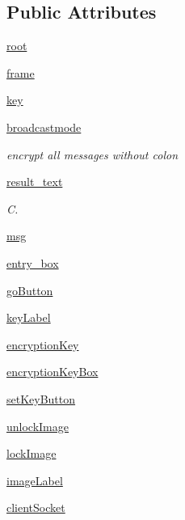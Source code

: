 \subsection*{Public Attributes}
\begin{DoxyCompactItemize}
\item 
\hyperlink{classgui_version_1_1_chat_client_g_u_i_afec7497b20c1d133c5c026c9625a1691}{root}
\item 
\hyperlink{classgui_version_1_1_chat_client_g_u_i_a7809572437bc7888072cb612990da273}{frame}
\item 
\hyperlink{classgui_version_1_1_chat_client_g_u_i_afe7983bc0c4a2f71030e992caca57b43}{key}
\item 
\hyperlink{classgui_version_1_1_chat_client_g_u_i_a24c3049b3a6f498d56685eef5405baf6}{broadcastmode}
\begin{DoxyCompactList}\small\item\em encrypt all messages without colon \end{DoxyCompactList}\item 
\hyperlink{classgui_version_1_1_chat_client_g_u_i_aed7ce16822dd2da856987bb7dbca00f7}{result\+\_\+text}
\begin{DoxyCompactList}\small\item\em C. \end{DoxyCompactList}\item 
\hyperlink{classgui_version_1_1_chat_client_g_u_i_a44a52021282a7dc6c04aa10b77d829e9}{msg}
\item 
\hyperlink{classgui_version_1_1_chat_client_g_u_i_a4436c621e5f3c806218c2756edf488f7}{entry\+\_\+box}
\item 
\hyperlink{classgui_version_1_1_chat_client_g_u_i_a5a09ecaf8a2c39309f7b7acdea272bc5}{go\+Button}
\item 
\hyperlink{classgui_version_1_1_chat_client_g_u_i_a5af88dbf7d3768e3b2b3d085c4560345}{key\+Label}
\item 
\hyperlink{classgui_version_1_1_chat_client_g_u_i_aafa39a201580f18372e0911d9667ccbd}{encryption\+Key}
\item 
\hyperlink{classgui_version_1_1_chat_client_g_u_i_a61e070d785a0e8308bf1a26788075258}{encryption\+Key\+Box}
\item 
\hyperlink{classgui_version_1_1_chat_client_g_u_i_a6f8fa5385bc6fa43fe07f02151b54dac}{set\+Key\+Button}
\item 
\hyperlink{classgui_version_1_1_chat_client_g_u_i_ac9bcddaa82b6d786fa50638f18fd814b}{unlock\+Image}
\item 
\hyperlink{classgui_version_1_1_chat_client_g_u_i_af4e157319d9a46549b533d5718e8d114}{lock\+Image}
\item 
\hyperlink{classgui_version_1_1_chat_client_g_u_i_adc513d1ee47a0582c35cc426cd582f1d}{image\+Label}
\item 
\hyperlink{classgui_version_1_1_chat_client_g_u_i_ad0d119fff1856994d498e1e9861451d5}{client\+Socket}
\end{DoxyCompactItemize}



